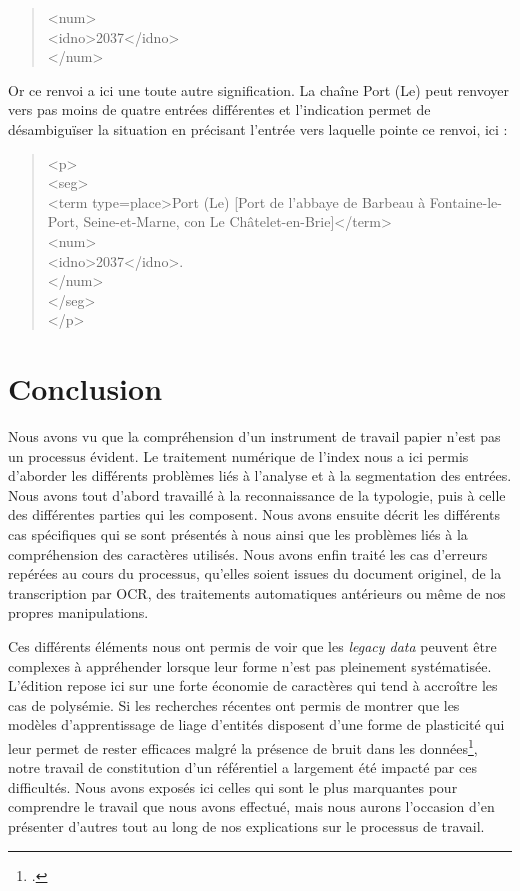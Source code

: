 \documentclass[a4paper,12pt,twoside]{book}
\begin{document}
	\begin{quotation}
		<num>\\
		\indent{}2037</idno>\\
	\end{quotation}

	\noindent Or ce renvoi a ici une toute autre signification. La chaîne \og Port (Le)\fg{} peut renvoyer vers pas moins de quatre entrées différentes et l'indication \og [2037]\fg{} permet de désambiguïser la situation en précisant l'entrée vers laquelle pointe ce renvoi, ici :
	
	\begin{quotation}
            <p>\\
				\indent{}\\
				\indent\indent\indent<term type=\textquotesingle place\textquotesingle >Port (Le) [Port de l'abbaye de Barbeau à Fontaine-le-Port,
				Seine-et-Marne, con Le Châtelet-en-Brie]</term>\\
				\indent\indent{}\\
				\indent\indent\indent\indent<idno>2037</idno>.\\
				\indent\indent\indent</num>\\
				\indent\indent</seg>\\
				\indent</p>
	\end{quotation}
	
	\section*{Conclusion}
	
	Nous avons vu que la compréhension d'un instrument de travail papier n'est pas un processus évident. Le traitement numérique de l'index nous a ici permis d'aborder les différents problèmes liés à l'analyse et à la segmentation des entrées. Nous avons tout d'abord travaillé à la reconnaissance de la typologie, puis à celle des différentes parties qui les composent. Nous avons ensuite décrit les différents cas spécifiques qui se sont présentés à nous ainsi que les problèmes liés à la compréhension des caractères utilisés. Nous avons enfin traité les cas d'erreurs repérées au cours du processus, qu'elles soient issues du document originel, de la transcription par OCR, des traitements automatiques antérieurs ou même de nos propres manipulations.
	
	Ces différents éléments nous ont permis de voir que les \textit{legacy data} peuvent être complexes à appréhender lorsque leur forme n'est pas pleinement systématisée. L'édition repose ici sur une forte économie de caractères qui tend à accroître les cas de polysémie. Si les recherches récentes ont permis de montrer que les modèles d'apprentissage de liage d'entités disposent d'une forme de plasticité qui leur permet de rester efficaces malgré la présence de bruit dans les données\footcite{linhares_pontes_impact_2019, koudoro-parfait_reconnaissance_2022}, notre travail de constitution d'un référentiel a largement été impacté par ces difficultés. Nous avons exposés ici celles qui sont le plus marquantes pour comprendre le travail que nous avons effectué, mais nous aurons l'occasion d'en présenter d'autres tout au long de nos explications sur le processus de travail.
	
\end{document}
